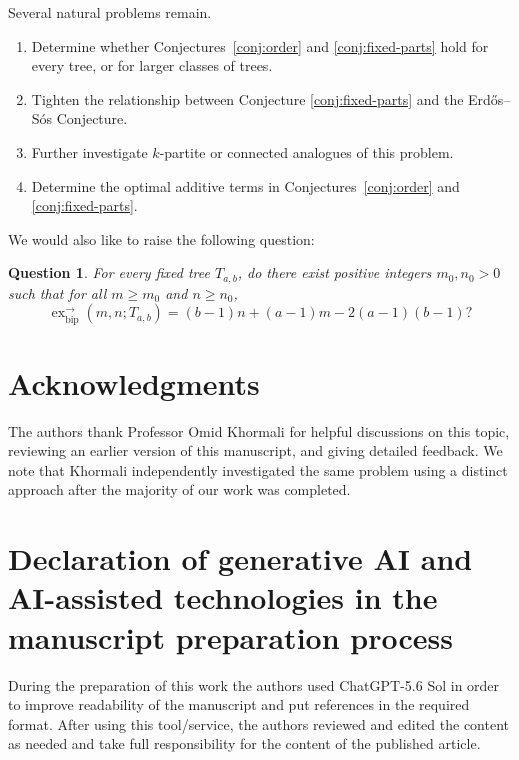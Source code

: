 \documentclass[12pt]{article}
\newtheorem{question}[theorem]{Question}
\theoremstyle{definition}
\theoremstyle{remark}
\newcommand{\exor}{\operatorname{ex}^{\rightarrow}_{\mathrm{bip}}}
\begin{document}
Several natural problems remain.

\begin{enumerate}[label=\textup{(\roman*)}]
    \item Determine whether Conjectures~\ref{conj:order} and \ref{conj:fixed-parts} hold for every tree, or for larger classes of trees. 

    \item Tighten the relationship between Conjecture \ref{conj:fixed-parts} and the Erd\H{o}s--S\'os Conjecture.

    \item Further investigate $k$-partite or connected analogues of this problem.

    \item Determine the optimal additive terms in Conjectures~\ref{conj:order} and \ref{conj:fixed-parts}.
\end{enumerate}

We would also like to raise the following question:
\begin{question}
    For every fixed tree $T_{a,b}$, do there exist positive integers $m_0,n_0>0$ such that for all $m\geq m_0$ and $n\geq n_0$,
    \[
    \exor(m,n;T_{a,b})=(b-1)n+(a-1)m-2(a-1)(b-1)?
    \]
\end{question}


\section*{Acknowledgments}

The authors thank Professor Omid Khormali for helpful discussions on this topic, reviewing an earlier version of this manuscript, and giving detailed feedback. We note that Khormali independently investigated the same problem using a distinct approach after the majority of our work was completed.

\section*{Declaration of generative AI and AI-assisted technologies in the manuscript preparation process}

During the preparation of this work the authors used ChatGPT-5.6 Sol in order to improve readability of the manuscript and put references in the required format. After using this tool/service, the authors reviewed and edited the content as needed and take full responsibility for the content of the published article.
\end{document}
